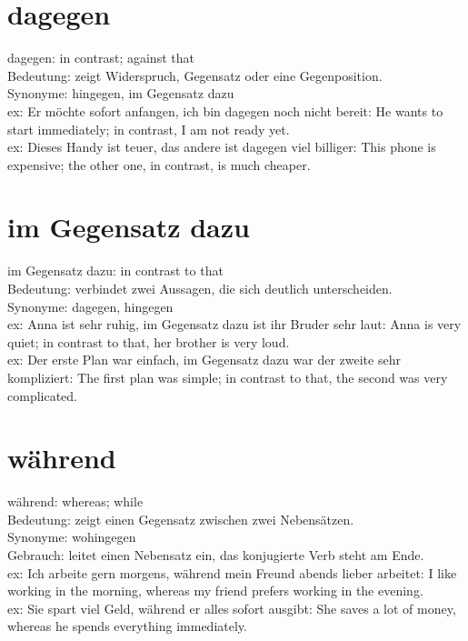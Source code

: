 \documentclass[a4paper]{article}
\begin{document}
    
    \section{dagegen}
        dagegen: in contrast; against that \\
        Bedeutung: zeigt Widerspruch, Gegensatz oder eine Gegenposition. \\
        Synonyme: hingegen, im Gegensatz dazu \\
        ex: Er möchte sofort anfangen, ich bin dagegen noch nicht bereit: He wants to start immediately; in contrast, I am not ready yet. \\
        ex: Dieses Handy ist teuer, das andere ist dagegen viel billiger: This phone is expensive; the other one, in contrast, is much cheaper. \\
    
    
    \section{im Gegensatz dazu}
        im Gegensatz dazu: in contrast to that \\
        Bedeutung: verbindet zwei Aussagen, die sich deutlich unterscheiden. \\
        Synonyme: dagegen, hingegen \\
        ex: Anna ist sehr ruhig, im Gegensatz dazu ist ihr Bruder sehr laut: Anna is very quiet; in contrast to that, her brother is very loud. \\
        ex: Der erste Plan war einfach, im Gegensatz dazu war der zweite sehr kompliziert: The first plan was simple; in contrast to that, the second was very complicated. \\
    
    
    \section{während}
        während: whereas; while \\
        Bedeutung: zeigt einen Gegensatz zwischen zwei Nebensätzen. \\
        Synonyme: wohingegen \\
        Gebrauch: leitet einen Nebensatz ein, das konjugierte Verb steht am Ende. \\
        ex: Ich arbeite gern morgens, während mein Freund abends lieber arbeitet: I like working in the morning, whereas my friend prefers working in the evening. \\
        ex: Sie spart viel Geld, während er alles sofort ausgibt: She saves a lot of money, whereas he spends everything immediately. \\
    
\end{document}
